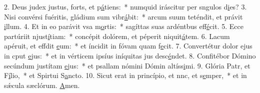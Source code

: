 2. Deus judex justus, forts, et p\uline{á}tiens:~* numquid iráscitur per sngulos d\uline{i}es?
3. Nisi convérsi fuéritis, gládium sum vibr\uline{á}bit:~* arcum suum teténdit, et právit \uline{i}llum.
4. Et in eo parávit vsa m\uline{o}rtis:~* sagíttas suas ardéntbus eff\uline{é}cit.
5. Ecce partúriit njust\uline{í}tiam:~* concépit dolórem, et péperit niquit\uline{á}tem.
6. Lacum apéruit, et effdit \uline{e}um:~* et íncidit in fóvam quam f\uline{e}cit.
7. Convertétur dolor ejus in cput \uline{e}jus:~* et in vérticem ipsíus iníquitas jus desc\uline{é}ndet.
8. Confitébor Dómino secúndum justítam \uline{e}jus:~* et psallam nómini Dómin altíss\uline{i}mi.
9. Glória Patr, et F\uline{í}lio,~* et Spirtui S\uline{a}ncto.
10. Sicut erat in princípio, et nnc, et s\uline{e}mper,~* et in sǽcula sæclórum. \uline{A}men.
